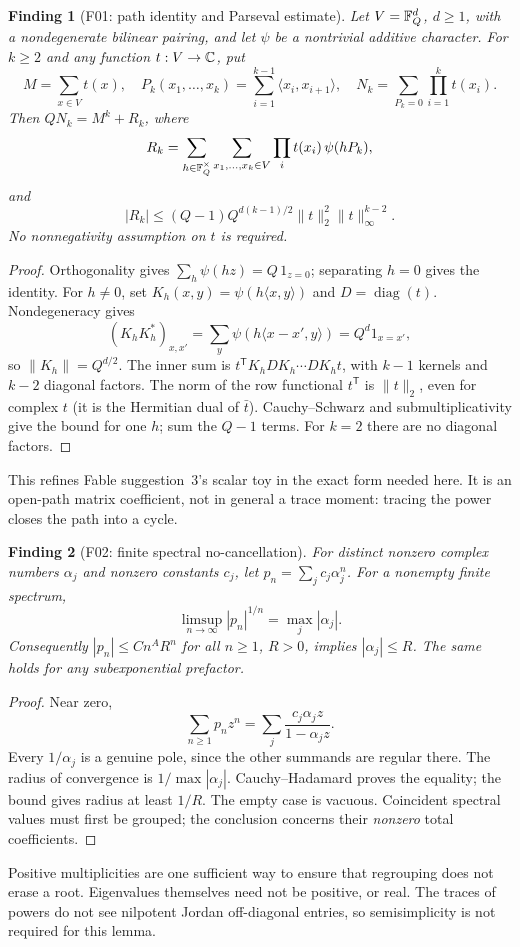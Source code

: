 \documentclass[11pt,a4paper]{article}
\newcommand{\fid}[1]{\textsf{#1}}\newcommand{\gate}[1]{\textsf{#1}}
\theoremstyle{named}\newtheorem{finding}{Finding}[section]
\theoremstyle{definition}\newtheorem{definition}[finding]{Definition}
\theoremstyle{remark}\newtheorem{remark}[finding]{Remark}
\begin{document}
\begin{finding}[\fid{F01}: path identity and Parseval estimate]\label{f:path}
Let $V=\mathbb F_Q^d$, $d\ge1$, with a nondegenerate bilinear pairing, and let $\psi$ be a nontrivial additive character. For $k\ge2$ and any function $t:V\to\mathbb C$, put
\[
 M=\sum_{x\in V}t(x),\quad
 P_k(x_1,\ldots,x_k)=\sum_{i=1}^{k-1}\langle x_i,x_{i+1}\rangle,
 \quad N_k=\sum_{P_k=0}\prod_{i=1}^k t(x_i).
\]
Then $QN_k=M^k+R_k$, where
\[
 R_k=\sum_{h\in\mathbb F_Q^\times}\sum_{x_1,\ldots,x_k\in V}
       \prod_i t(x_i)\,\psi(hP_k),
\]
and
\begin{equation}\label{eq:parseval}
 |R_k|\le (Q-1)Q^{d(k-1)/2}\|t\|_2^2\|t\|_\infty^{k-2}.
\end{equation}
No nonnegativity assumption on $t$ is required.
\end{finding}
\begin{proof}
Orthogonality gives $\sum_h\psi(hz)=Q\,1_{z=0}$; separating $h=0$ gives the identity. For $h\ne0$, set $K_h(x,y)=\psi(h\langle x,y\rangle)$ and $D=\operatorname{diag}(t)$. Nondegeneracy gives
\[
 (K_hK_h^*)_{x,x'}=\sum_y\psi(h\langle x-x',y\rangle)
 =Q^d1_{x=x'},
\]
so $\|K_h\|=Q^{d/2}$. The inner sum is
$t^{\mathsf T}K_hD K_h\cdots D K_ht$, with $k-1$ kernels and $k-2$ diagonal factors. The norm of the row functional $t^{\mathsf T}$ is $\|t\|_2$, even for complex $t$ (it is the Hermitian dual of $\bar t$). Cauchy--Schwarz and submultiplicativity give the bound for one $h$; sum the $Q-1$ terms. For $k=2$ there are no diagonal factors.
\end{proof}
This refines Fable suggestion~3's scalar toy in the exact form needed here. It is an open-path matrix coefficient, not in general a trace moment: tracing the power closes the path into a cycle.

\begin{finding}[\fid{F02}: finite spectral no-cancellation]\label{f:spectral}
For distinct nonzero complex numbers $\alpha_j$ and nonzero constants $c_j$, let $p_n=\sum_jc_j\alpha_j^n$. For a nonempty finite spectrum,
\[
 \limsup_{n\to\infty}|p_n|^{1/n}=\max_j|\alpha_j|.
\]
Consequently $|p_n|\le Cn^A R^n$ for all $n\ge1$, $R>0$, implies $|\alpha_j|\le R$. The same holds for any subexponential prefactor.
\end{finding}
\begin{proof}
Near zero,
\[
 \sum_{n\ge1}p_nz^n=\sum_j\frac{c_j\alpha_jz}{1-\alpha_jz}.
\]
Every $1/\alpha_j$ is a genuine pole, since the other summands are regular there. The radius of convergence is $1/\max|\alpha_j|$. Cauchy--Hadamard proves the equality; the bound gives radius at least $1/R$. The empty case is vacuous. Coincident spectral values must first be grouped; the conclusion concerns their \emph{nonzero} total coefficients.
\end{proof}
Positive multiplicities are one sufficient way to ensure that regrouping does not erase a root. Eigenvalues themselves need not be positive, or real. The traces of powers do not see nilpotent Jordan off-diagonal entries, so semisimplicity is not required for this lemma.
\end{document}
